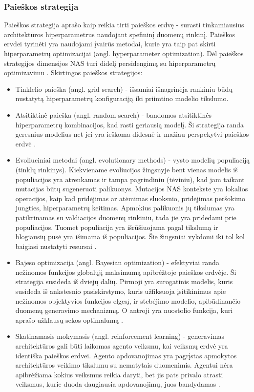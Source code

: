 \documentclass{VUMIFPSbakalaurinis}
\begin{document}
\subsubsection{Paieškos strategija}

Paieškos strategija aprašo kaip reikia tirti paieškos erdvę - surasti tinkamiausius architektūros hiperparametrus naudojant spefininį duomenų rinkinį. Paieškos ervdei tyrinėti yra naudojami įvairūs metodai, kurie yra taip pat skirti hiperparametrų optimizacijai (angl. hyperparameter optimization). Dėl paieškos strategijos dimensijos NAS turi didelį persidengimą su hiperparametrų optimizavimu \cite{feurer-automlbook18a}.
Skirtingos paieškos strategijos:
\begin{itemize}
    \item Tinklelio paieška (angl. grid search) - išsamiai išnagrinėja rankiniu būdų nustatytą hiperparametrų konfiguraciją iki priimtino modelio tikslumo. 
    \item Atsitiktinė paieška (angl. random search) - bandomos atsitiktinės hiperparametrų kombinacijos, kad rasti geriausią modelį. Ši strategija randa geresnius modelius net jei yra ieškoma didesnė ir mažiau perspekytvi paieškos erdvė \cite{Bergstra:2012:RSH:2503308.2188395}. 
    \item Evoliuciniai metodai (angl. evolutionary methods) - vysto modelių populiaciją (tinklų rinkinys). Kiekviename evoliucijos žingsnyje bent vienas modelis iš populiacijos yra atrenkamas ir tampa pagrindiniu (tėviniu), kad jam taikant mutacijas būtų sugeneruoti palikuonys. Mutacijos NAS kontekste yra lokalios operacijos, kaip kad pridėjimas ar atėmimas sluoksnio, pridėjimas peršokimo jungties, hiperparametrų keitimas. Apmokius palikuonis jų tikslumas yra patikrinamas su valdiacijos duomenų rinkiniu, tada jie yra pridedami prie populiacijos. Tuomet populiacija yra išrūšiuojama pagal tikslumą ir blogiausių pusė yra išimama iš populiacijos. Šie žingsniai vykdomi iki tol kol baigiasi nustatyti resursai \cite{DBLP:journals/corr/abs-1812-05866}.
    \item Bajeso optimizacija (angl. Bayesian optimization) - efektyviai randa nežinomos funkcijos globalųjį maksimumą apibrėžtoje paieškos erdvėje. Ši strategija susideda iš dviejų dalių. Pirmoji yra surogatinis modelis, kuris susideda iš ankstesnio pasiskirstymo, kuris užfiksuoja įsitikinimus apie nežinomos objektyvios funkcijos elgesį, ir stebėjimo modelio, apibūdinančio duomenų generavimo mechanizmą. O antroji yra nuostolio funkcija, kuri aprašo užklausų sekos optimalumą \cite{7352306}. 
    \item Skatinamasis mokymasis (angl. reinforcement learning) - generavimas architektūros gali būti laikomas agento veiksmu, kai veiksmų erdvė yra identiška paieškos erdvei. Agento apdovanojimas yra pagrįstas apmokytos architektūros veikimo tikslumu su nematytais duomenimis. Agentui nėra apibrėžiama kokius veiksmus reikia daryti, bet jis pats privalo atrasti veiksmus, kurie duoda daugiausia apdovanojimų, juos bandydamas \cite{Sutton:1998:IRL:551283}.
\end{itemize}
\end{document}
